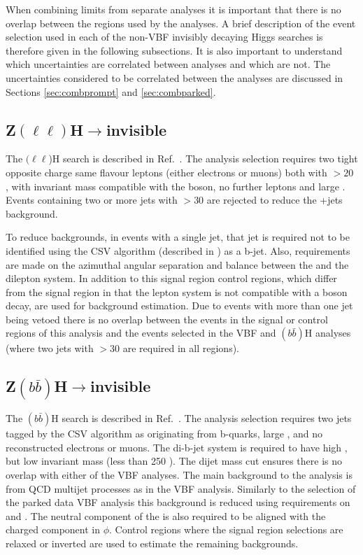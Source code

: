 
When combining limits from separate analyses it is important that there is no overlap between the regions used by the analyses. A brief description of the event selection used in each of the non-\ac{VBF} invisibly decaying Higgs searches is therefore given in the following subsections. It is also important to understand which uncertainties are correlated between analyses and which are not. The uncertainties considered to be correlated between the analyses are discussed in Sections \ref{sec:combprompt} and \ref{sec:combparked}. 


\subsection{Z$(\ell\ell)$H$\rightarrow$invisible}
\label{sec:zllh}
The \PZ$(\ell\ell$)H search is described in Ref.~\cite{CMS-PAS-HIG-13-018}. The analysis selection requires two tight opposite charge same flavour leptons (either electrons or muons) both with \pt$>20$ \GeV, with invariant mass compatible with the \PZ boson, no further leptons and large \MET. Events containing two or more jets with \pt$>30$ \GeV are rejected to reduce the \PZ+jets background. 

To reduce backgrounds, in events with a single jet, that jet is required not to be identified using the \ac{CSV} algorithm (described in ) as a b-jet. Also, requirements are made on the azimuthal angular separation and \pt balance between the \MET and the dilepton system. In addition to this signal region control regions, which differ from the signal region in that the lepton system is not compatible with a \PZ boson decay, are used for background estimation. Due to events with more than one jet being vetoed there is no overlap between the events in the signal or control regions of this analysis and the events selected in the \ac{VBF} and \PZ$(b\bar{b})$H analyses (where two jets with \pt$>30$ \GeV are required in all regions). 


\subsection{Z$(b\bar{b})$H$\rightarrow$invisible}
\label{sec:zbbh}
The \PZ$(b\bar{b})$H search is described in Ref.~\cite{CMS-PAS-HIG-13-028}. The analysis selection requires two jets tagged by the \ac{CSV} algorithm as originating from b-quarks, large \MET, and no reconstructed electrons or muons. The di-b-jet system is required to have high \pt, but low invariant mass (less than 250 \GeV). The dijet mass cut ensures there is no overlap with either of the \ac{VBF} analyses. The main background to the analysis is from \ac{QCD} multijet processes as in the \ac{VBF} analysis. Similarly to the selection of the parked data \ac{VBF} analysis this background is reduced using requirements on \jetmetdphi and \METsig. The neutral component of the \MET is also required to be aligned with the charged component in $\phi$. Control regions where the signal region selections are relaxed or inverted are used to estimate the remaining backgrounds.

